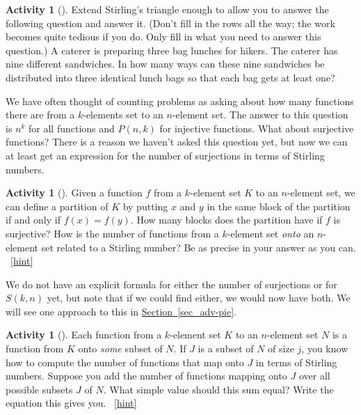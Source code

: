 \documentclass[10pt,]{book}
\theoremstyle{plain}
\theoremstyle{definition}
\theoremstyle{definition}
\theoremstyle{definition}
\newtheorem{activity}[project]{Activity}
\numberwithin{equation}{chapter}
\begin{document}
\begin{activity}[]\label{sandwiches}
\hypertarget{p-1097}{}%
Extend Stirling's triangle enough to allow you to answer the following question and answer it. (Don't fill in the rows all the way; the work becomes quite tedious if you do. Only fill in what you need to answer this question.) A caterer is preparing three bag lunches for hikers. The caterer has nine different sandwiches. In how many ways can these nine sandwiches be distributed into three identical lunch bags so that each bag gets at least one?%
\end{activity}
\hypertarget{p-1099}{}%
We have often thought of counting problems as asking about how many functions there are from a \(k\)-elements set to an \(n\)-element set.  The answer to this question is \(n^k\) for all functions and \(P(n,k)\) for injective functions.  What about surjective functions?  There is a reason we haven't asked this question yet, but now we can at least get an expression for the number of surjections in terms of Stirling numbers.%
\begin{activity}[]\label{activity-196}
\hypertarget{p-1100}{}%
Given a function \(f\) from a \(k\)-element set \(K\) to an \(n\)-element set, we can define a partition of \(K\) by putting \(x\) and \(y\) in the same block of the partition if and only if \(f(x)=f(y)\). How many blocks does the partition have if \(f\) is surjective? How is the number of functions from a \(k\)-element set \emph{onto} an \(n\)-element set related to a Stirling number? Be as precise in your answer as you can.%
~\hfill{\tiny\hyperlink{a-203}{[hint]}\hypertarget{q-203}{}}\end{activity}
\hypertarget{p-1103}{}%
We do not have an explicit formula for either the number of surjections or for \(S(k,n)\) yet, but note that if we could find either, we would now have both.  We will see one approach to this in \hyperref[sec_adv-pie]{Section~\ref{sec_adv-pie}}.%
\begin{activity}[]\label{Stirlingfalling}
\hypertarget{p-1104}{}%
Each function from a \(k\)-element set \(K\) to an \(n\)-element set \(N\) is a function from \(K\) onto \emph{some} subset of \(N\). If \(J\) is a subset of \(N\) of size \(j\), you know how to compute the number of functions that map onto \(J\) in terms of Stirling numbers. Suppose you add the number of functions mapping onto \(J\) over all possible subsets \(J\) of \(N\). What simple value should this sum equal? Write the equation this gives you.%
~\hfill{\tiny\hyperlink{a-204}{[hint]}\hypertarget{q-204}{}}\end{activity}
\end{document}
